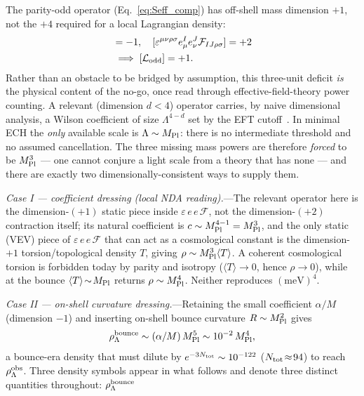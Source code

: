 \documentclass[aps,prd,twocolumn,superscriptaddress,showpacs,preprintnumbers,nofootinbib,longbibliography,floatfix]{revtex4-2}
\newcommand{\MPl}{M_{\rm Pl}}
\begin{document}
The parity-odd operator (Eq.~\ref{eq:Seff_comp}) has off-shell mass dimension
$+1$, not the $+4$ required for a local Lagrangian density:
\begin{align}
[\alpha/M] &= -1, \quad
[\varepsilon^{\mu\nu\rho\sigma}e^I_\mu e^J_\nu\mathcal{F}_{IJ\rho\sigma}] = +2 \nonumber\\
&\;\Longrightarrow\; [\mathcal{L}_{\rm odd}] = +1.
\end{align}
Rather than an obstacle to be bridged by assumption, this three-unit
deficit \emph{is} the physical content of the no-go, once read through
effective-field-theory power counting. A relevant (dimension $d<4$)
operator carries, by naive dimensional analysis, a Wilson coefficient of
size $\Lambda^{4-d}$ set by the EFT cutoff~\cite{Buchalla2013NDA,Brivio2017SMEFT,Isidori2023SMEFTReview}.
In minimal ECH the \emph{only} available scale is $\Lambda\sim\MPl$: there
is no intermediate threshold and no assumed cancellation. The three missing
mass powers are therefore \emph{forced} to be $\MPl^{3}$ --- one cannot
conjure a light scale from a theory that has none --- and there are exactly
two dimensionally-consistent ways to supply them.
\par
\textit{Case I --- coefficient dressing (local NDA reading).}---The relevant
operator here is the dimension-$(+1)$ static piece inside
$\varepsilon\,e\,e\,\mathcal{F}$, not the dimension-$(+2)$ contraction
itself; its natural coefficient is $c\sim\MPl^{4-1}=\MPl^{3}$, and the
only static (VEV) piece of $\varepsilon\,e\,e\,\mathcal{F}$ that can act as a
cosmological constant is the dimension-$+1$ torsion/topological density $T$,
giving $\rho\sim\MPl^{3}\langle T\rangle$. A coherent cosmological torsion is
forbidden today by parity and isotropy ($\langle T\rangle\!\to\!0$, hence
$\rho\!\to\!0$), while at the bounce $\langle T\rangle\!\sim\!\MPl$ returns
$\rho\sim\MPl^{4}$. Neither reproduces $(\text{meV})^{4}$.
\par
\textit{Case II --- on-shell curvature dressing.}---Retaining the small
coefficient $\alpha/M$ (dimension $-1$) and inserting on-shell bounce
curvature $R\sim\MPl^{2}$ gives
\begin{equation}
\rho_\Lambda^{\rm bounce}\sim(\alpha/M)\,\MPl^5 \sim 10^{-2}\,\MPl^4,
\label{eq:onshell_rho}
\end{equation}
a bounce-era density that must dilute by $e^{-3N_{\rm tot}}\sim10^{-122}$
($N_{\rm tot}\!\approx\!94$) to reach $\rho_\Lambda^{\rm obs}$.
Three density symbols appear in what follows and denote three distinct
quantities throughout: $\rho_\Lambda^{\rm bounce}$
\end{document}
